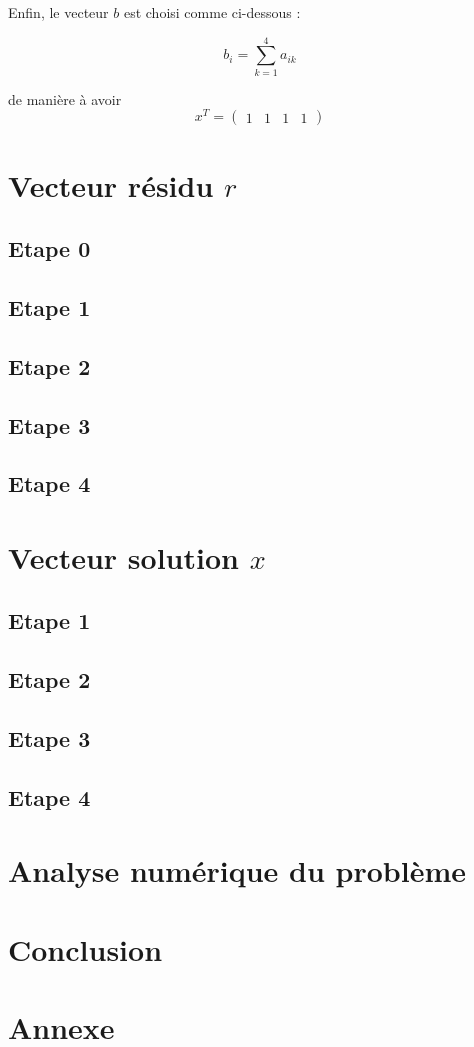 \documentclass[12,french]{report}
\begin{document}
Enfin, le vecteur $b$ est choisi comme ci-dessous :

$$b_i=\sum_{k=1}^4a_{ik}$$

de manière à avoir 
$$x^T=\left(\begin{array}{cccc}
1 & 1 & 1 & 1\end{array}\right)$$




\chapter{Vecteur résidu $r$} %

\section{Etape 0}

\section{Etape 1}

\section{Etape 2}

\section{Etape 3}

\section{Etape 4}

\chapter{Vecteur solution $x$} %

\section{Etape 1}

\section{Etape 2}

\section{Etape 3}

\section{Etape 4}

\chapter{Analyse numérique du problème} %

\chapter*{Conclusion} %

\chapter*{Annexe}
\end{document}
